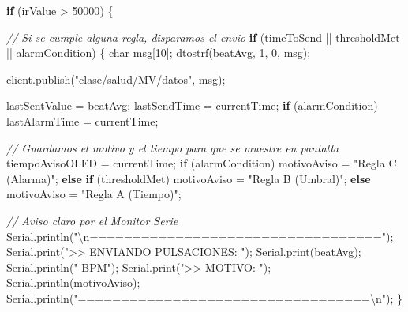\documentclass[11pt]{article}
\newenvironment{Shaded}{}{}
\newcommand{\DataTypeTok}[1]{\textcolor[rgb]{0.56,0.13,0.00}{{#1}}}
\newcommand{\DecValTok}[1]{\textcolor[rgb]{0.25,0.63,0.44}{{#1}}}
\newcommand{\StringTok}[1]{\textcolor[rgb]{0.25,0.44,0.63}{{#1}}}
\newcommand{\CommentTok}[1]{\textcolor[rgb]{0.38,0.63,0.69}{\textit{{#1}}}}
\newcommand{\NormalTok}[1]{{#1}}
\newcommand{\SpecialCharTok}[1]{\textcolor[rgb]{0.25,0.44,0.63}{{#1}}}
\newcommand{\ControlFlowTok}[1]{\textcolor[rgb]{0.00,0.44,0.13}{\textbf{{#1}}}}
\newcommand{\OperatorTok}[1]{\textcolor[rgb]{0.40,0.40,0.40}{{#1}}}
\begin{document}
\begin{Shaded}
\begin{Highlighting}[]
  \ControlFlowTok{if} \OperatorTok{(}\NormalTok{irValue }\OperatorTok{\textgreater{}} \DecValTok{50000}\OperatorTok{)} \OperatorTok{\{}

    \CommentTok{// Si se cumple alguna regla, disparamos el envio}
    \ControlFlowTok{if} \OperatorTok{(}\NormalTok{timeToSend }\OperatorTok{||}\NormalTok{ thresholdMet }\OperatorTok{||}\NormalTok{ alarmCondition}\OperatorTok{)} \OperatorTok{\{}
      \DataTypeTok{char}\NormalTok{ msg}\OperatorTok{[}\DecValTok{10}\OperatorTok{];}
\NormalTok{      dtostrf}\OperatorTok{(}\NormalTok{beatAvg}\OperatorTok{,} \DecValTok{1}\OperatorTok{,} \DecValTok{0}\OperatorTok{,}\NormalTok{ msg}\OperatorTok{);}

\NormalTok{      client}\OperatorTok{.}\NormalTok{publish}\OperatorTok{(}\StringTok{"clase/salud/MV/datos"}\OperatorTok{,}\NormalTok{ msg}\OperatorTok{);}

\NormalTok{      lastSentValue }\OperatorTok{=}\NormalTok{ beatAvg}\OperatorTok{;}
\NormalTok{      lastSendTime }\OperatorTok{=}\NormalTok{ currentTime}\OperatorTok{;}
      \ControlFlowTok{if} \OperatorTok{(}\NormalTok{alarmCondition}\OperatorTok{)}\NormalTok{ lastAlarmTime }\OperatorTok{=}\NormalTok{ currentTime}\OperatorTok{;}

      \CommentTok{// Guardamos el motivo y el tiempo para que se muestre en pantalla}
\NormalTok{      tiempoAvisoOLED }\OperatorTok{=}\NormalTok{ currentTime}\OperatorTok{;}
      \ControlFlowTok{if} \OperatorTok{(}\NormalTok{alarmCondition}\OperatorTok{)}\NormalTok{ motivoAviso }\OperatorTok{=} \StringTok{"Regla C (Alarma)"}\OperatorTok{;}
      \ControlFlowTok{else} \ControlFlowTok{if} \OperatorTok{(}\NormalTok{thresholdMet}\OperatorTok{)}\NormalTok{ motivoAviso }\OperatorTok{=} \StringTok{"Regla B (Umbral)"}\OperatorTok{;}
      \ControlFlowTok{else}\NormalTok{ motivoAviso }\OperatorTok{=} \StringTok{"Regla A (Tiempo)"}\OperatorTok{;}

      \CommentTok{// Aviso claro por el Monitor Serie}
\NormalTok{      Serial}\OperatorTok{.}\NormalTok{println}\OperatorTok{(}\StringTok{"}\SpecialCharTok{\textbackslash{}n}\StringTok{=================================="}\OperatorTok{);}
\NormalTok{      Serial}\OperatorTok{.}\NormalTok{print}\OperatorTok{(}\StringTok{"\textgreater{}\textgreater{} ENVIANDO PULSACIONES: "}\OperatorTok{);}
\NormalTok{      Serial}\OperatorTok{.}\NormalTok{print}\OperatorTok{(}\NormalTok{beatAvg}\OperatorTok{);}
\NormalTok{      Serial}\OperatorTok{.}\NormalTok{println}\OperatorTok{(}\StringTok{" BPM"}\OperatorTok{);}
\NormalTok{      Serial}\OperatorTok{.}\NormalTok{print}\OperatorTok{(}\StringTok{"\textgreater{}\textgreater{} MOTIVO: "}\OperatorTok{);}
\NormalTok{      Serial}\OperatorTok{.}\NormalTok{println}\OperatorTok{(}\NormalTok{motivoAviso}\OperatorTok{);}
\NormalTok{      Serial}\OperatorTok{.}\NormalTok{println}\OperatorTok{(}\StringTok{"==================================}\SpecialCharTok{\textbackslash{}n}\StringTok{"}\OperatorTok{);}
    \OperatorTok{\}}


\end{Highlighting}
\end{Shaded}
\end{document}
